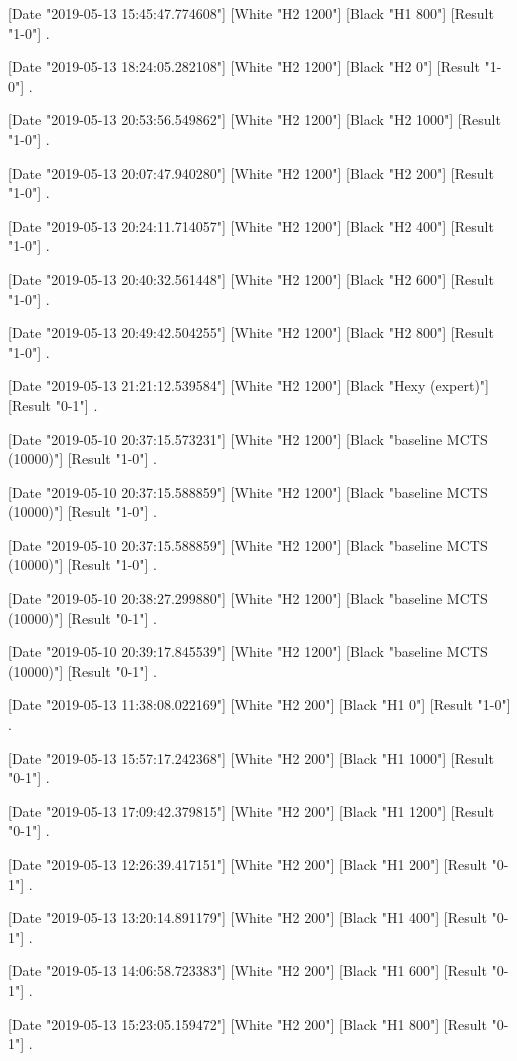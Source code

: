 {[Date "2019-05-13 15:45:47.774608"]
[White "H2 1200"]
[Black "H1 800"]
[Result "1-0"]
.

[Date "2019-05-13 18:24:05.282108"]
[White "H2 1200"]
[Black "H2 0"]
[Result "1-0"]
.

[Date "2019-05-13 20:53:56.549862"]
[White "H2 1200"]
[Black "H2 1000"]
[Result "1-0"]
.

[Date "2019-05-13 20:07:47.940280"]
[White "H2 1200"]
[Black "H2 200"]
[Result "1-0"]
.

[Date "2019-05-13 20:24:11.714057"]
[White "H2 1200"]
[Black "H2 400"]
[Result "1-0"]
.

[Date "2019-05-13 20:40:32.561448"]
[White "H2 1200"]
[Black "H2 600"]
[Result "1-0"]
.

[Date "2019-05-13 20:49:42.504255"]
[White "H2 1200"]
[Black "H2 800"]
[Result "1-0"]
.

[Date "2019-05-13 21:21:12.539584"]
[White "H2 1200"]
[Black "Hexy (expert)"]
[Result "0-1"]
.

[Date "2019-05-10 20:37:15.573231"]
[White "H2 1200"]
[Black "baseline MCTS (10000)"]
[Result "1-0"]
.

[Date "2019-05-10 20:37:15.588859"]
[White "H2 1200"]
[Black "baseline MCTS (10000)"]
[Result "1-0"]
.

[Date "2019-05-10 20:37:15.588859"]
[White "H2 1200"]
[Black "baseline MCTS (10000)"]
[Result "1-0"]
.

[Date "2019-05-10 20:38:27.299880"]
[White "H2 1200"]
[Black "baseline MCTS (10000)"]
[Result "0-1"]
.

[Date "2019-05-10 20:39:17.845539"]
[White "H2 1200"]
[Black "baseline MCTS (10000)"]
[Result "0-1"]
.

[Date "2019-05-13 11:38:08.022169"]
[White "H2 200"]
[Black "H1 0"]
[Result "1-0"]
.

[Date "2019-05-13 15:57:17.242368"]
[White "H2 200"]
[Black "H1 1000"]
[Result "0-1"]
.

[Date "2019-05-13 17:09:42.379815"]
[White "H2 200"]
[Black "H1 1200"]
[Result "0-1"]
.

[Date "2019-05-13 12:26:39.417151"]
[White "H2 200"]
[Black "H1 200"]
[Result "0-1"]
.

[Date "2019-05-13 13:20:14.891179"]
[White "H2 200"]
[Black "H1 400"]
[Result "0-1"]
.

[Date "2019-05-13 14:06:58.723383"]
[White "H2 200"]
[Black "H1 600"]
[Result "0-1"]
.

[Date "2019-05-13 15:23:05.159472"]
[White "H2 200"]
[Black "H1 800"]
[Result "0-1"]
.

}
